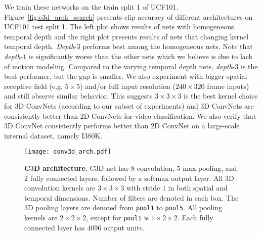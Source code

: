 \documentclass[10pt,twocolumn,letterpaper]{article}
\begin{document}
We train these networks on the train split 1 of UCF101. Figure~\ref{fig:c3d_arch_search} presents clip accuracy of different architectures on UCF101 test split 1. The left plot shows results of nets with homogeneous temporal depth and the right plot presents results of nets that changing kernel temporal depth. \emph{Depth}-$3$ performs best among the homogeneous nets. Note that \emph{depth}-$1$ is significantly worse than the other nets which we believe is due to lack of motion modeling. Compared to the varying temporal depth nets, \emph{depth}-$3$ is the best performer, but the gap is smaller. We also experiment with bigger spatial receptive field (e.g. $5 \times 5$) and/or full input resolution ($240 \times 320$ frame inputs) and still observe similar behavior. This suggests $3 \times 3 \times 3$ is the best kernel choice for 3D ConvNets (according to our subset of experiments) and 3D ConvNets are consistently better than 2D ConvNets for video classification. We also verify that 3D ConvNet consistently performs better than 2D ConvNet on a large-scale internal dataset, namely I380K.



\begin{figure*}
\begin{center}
   \texttt{[image: conv3d\_arch.pdf]}
\end{center}
\vspace{-18px}
   \caption{{\bf C$3$D architecture}. C3D net has $8$ convolution, $5$ max-pooling, and $2$ fully connected layers, followed by a softmax output layer. All $3$D convolution kernels are $3 \times 3 \times 3$ with stride $1$ in both spatial and temporal dimensions. Number of filters are denoted in each box. The $3$D pooling layers are denoted from \texttt{pool1} to \texttt{pool5}. All pooling kernels are $2 \times 2 \times 2$, except for \texttt{pool1} is $1 \times 2 \times 2$. Each fully connected layer has $4096$ output units.}
\label{fig:conv3d}
\end{figure*}
\end{document}
